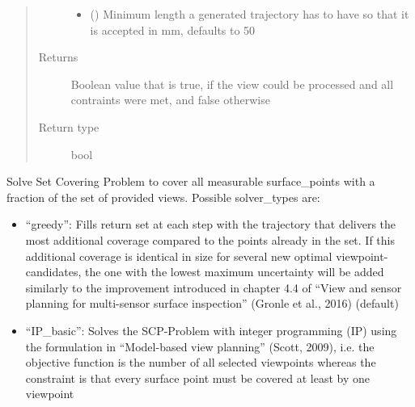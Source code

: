 \documentclass[letterpaper,10pt,english]{sphinxmanual}
\begin{document}
\begin{fulllineitems}
\begin{fulllineitems}
\begin{quote}
\begin{description}
\begin{itemize}
\item {} 
 (\sphinxstyleliteralemphasis{, }) \textendash{} Minimum length a generated trajectory has to have so that it is accepted in mm, defaults to 50

\end{itemize}

\item[{Returns}] \leavevmode
Boolean value that is true, if the view could be processed and all contraints were met, and false otherwise

\item[{Return type}] \leavevmode
bool

\end{description}\end{quote}

\end{fulllineitems}


\begin{fulllineitems}
\label{\detokenize{module_trajectory_manager:agiprobot_measurement.trajectory_manager.TrajectoryManager.solve_scp}}
Solve Set Covering Problem to cover all measurable surface\_points with a fraction of the set of provided views.
Possible solver\_types are:
\begin{itemize}
\item {} 
“greedy”: Fills return set at each step with the trajectory that delivers the most
additional coverage compared to the points already in the set. If this additional coverage is
identical in size for several new optimal viewpoint-candidates, the one with the lowest maximum
uncertainty will be added similarly to the improvement introduced in chapter 4.4 of 
“View and sensor planning for multi-sensor surface inspection” (Gronle et al., 2016)  (default)

\item {} 
“IP\_basic”: Solves the SCP-Problem with integer programming (IP) using the formulation in
“Model-based view planning” (Scott, 2009), i.e. the objective function is the number of all
selected viewpoints whereas the constraint is that every surface point must be covered at least by one viewpoint


\end{itemize}
\end{fulllineitems}
\end{fulllineitems}
\end{document}
